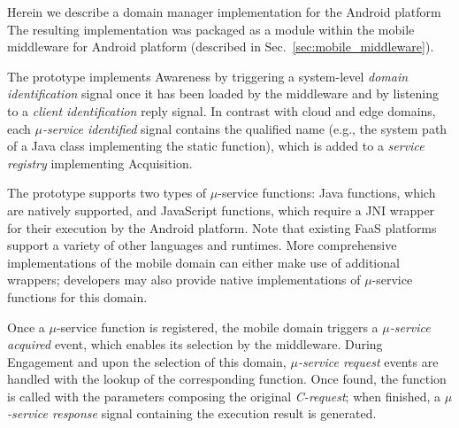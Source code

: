 Herein we describe a domain manager implementation for the Android platform
The resulting implementation was packaged as a module within the mobile middleware for Android platform (described in Sec.~\ref{sec:mobile_middleware}). 

The prototype implements Awareness by triggering a system-level \textit{domain identification} signal once it has been loaded by the middleware and by listening to a \textit{client identification} reply signal. 
In contrast with cloud and edge domains, 
each \textit{$\mu$-service identified} signal contains the qualified name (e.g., the system path of a Java class implementing the static function), which is added to a \textit{service registry} implementing Acquisition. 

The prototype supports two types of $\mu$-service functions: Java functions, which are natively supported, and JavaScript functions, which require a JNI wrapper for their execution by the Android platform. Note that existing FaaS platforms support a variety of other languages and runtimes. More comprehensive implementations of the mobile domain can either make use of additional wrappers; developers may also provide native implementations of $\mu$-service functions for this domain. 


Once a $\mu$-service function is registered, the mobile domain triggers a \textit{$\mu$-service acquired} event, which enables its selection by the middleware. During Engagement and upon the selection of this domain, \textit{$\mu$-service request} events are handled with the lookup of the corresponding function. Once found, the function is called with the parameters composing the original \textit{C-request}; when finished, a \textit{$\mu$-service response} signal containing the execution result is generated.



